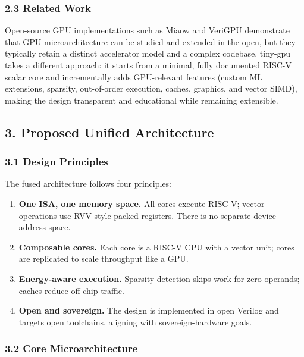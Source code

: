 \subsubsection{2.3 Related Work}\label{23-related-work}

Open-source GPU implementations such as Miaow and VeriGPU demonstrate
that GPU microarchitecture can be studied and extended in the open, but
they typically retain a distinct accelerator model and a complex
codebase. tiny-gpu takes a different approach: it starts from a minimal,
fully documented RISC-V scalar core and incrementally adds GPU-relevant
features (custom ML extensions, sparsity, out-of-order execution,
caches, graphics, and vector SIMD), making the design transparent and
educational while remaining extensible.

\subsection{3. Proposed Unified
Architecture}\label{3-proposed-unified-architecture}

\subsubsection{3.1 Design Principles}\label{31-design-principles}

The fused architecture follows four principles:

\begin{enumerate}
\def\labelenumi{\arabic{enumi}.}
\tightlist
\item
  \textbf{One ISA, one memory space.} All cores execute RISC-V; vector
  operations use RVV-style packed registers. There is no separate device
  address space.
\item
  \textbf{Composable cores.} Each core is a RISC-V CPU with a vector
  unit; cores are replicated to scale throughput like a GPU.
\item
  \textbf{Energy-aware execution.} Sparsity detection skips work for
  zero operands; caches reduce off-chip traffic.
\item
  \textbf{Open and sovereign.} The design is implemented in open Verilog
  and targets open toolchains, aligning with sovereign-hardware goals.
\end{enumerate}

\subsubsection{3.2 Core
Microarchitecture}\label{32-core-microarchitecture}

